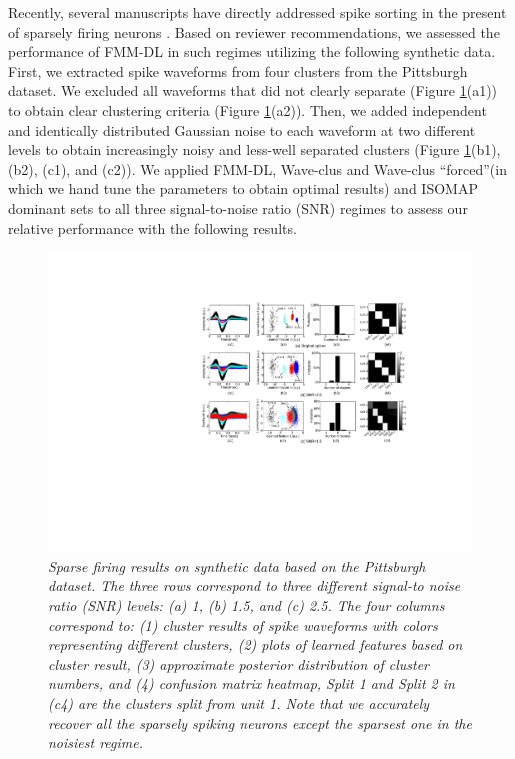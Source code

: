 \documentclass[journal]{IEEEtran}
\begin{document}
Recently, several manuscripts have directly addressed spike sorting in the present of sparsely firing neurons \cite{Pedreira2012, Adamos2012}.  Based on reviewer recommendations, we assessed the performance of FMM-DL in such regimes utilizing the following synthetic data.  First, we extracted spike waveforms from four clusters from the Pittsburgh dataset.  We excluded all waveforms that did not clearly separate (Figure \ref{fig:Sparse_firing_neuron}(a1))
to obtain clear clustering criteria (Figure \ref{fig:Sparse_firing_neuron}(a2)).  Then, we added independent and identically distributed Gaussian noise to each waveform at two different levels to obtain increasingly noisy and less-well separated clusters (Figure \ref{fig:Sparse_firing_neuron}(b1), (b2), (c1), and (c2)).  We applied FMM-DL, Wave-clus \cite{Pedreira2012} and Wave-clus ``forced''(in which we hand tune the parameters to obtain optimal results) and ISOMAP dominant sets \cite{Adamos2012} to all three signal-to-noise ratio (SNR) regimes to assess our relative performance with the following results.

\begin{figure}[!htbp]
\centering

   \includegraphics[scale=1,angle=0] {figs_new/sparse_firing.pdf}
  \caption{\small \emph{
Sparse firing results on synthetic data based on the Pittsburgh dataset. 
The three rows correspond to three different signal-to noise ratio (SNR) levels: (a) 1, (b) 1.5, and (c) 2.5. The four columns correspond to: (1) cluster results of spike waveforms with colors representing different clusters, (2) plots of learned features  based on cluster result, (3) approximate posterior distribution of cluster numbers, and (4) confusion matrix heatmap, Split 1 and Split 2 in (c4) are the clusters split from unit 1. Note that we accurately recover all the sparsely spiking neurons except the sparsest one in the noisiest regime.
   }}
   \label{fig:Sparse_firing_neuron}
\end{figure}
\end{document}
